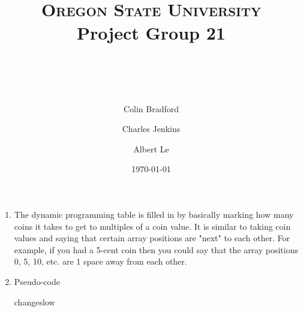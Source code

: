 \documentclass[paper=a4, fontsize=11pt]{scrartcl} %
\title{ 
    \normalfont \normalsize 
    \textsc{Oregon State University} \\ [25pt]
    \large Project Group 21
    \horrule{0.5pt} \\[0.4cm] %
    \huge \hwtitle \\ %
    \horrule{2pt} \\[0.5cm] %
}
\author{
    Colin Bradford
    \and
    Charles Jenkins
    \and
    Albert Le
} %
\date{\normalsize\today} %
\numberwithin{equation}{section} %
\numberwithin{figure}{section} %
\numberwithin{table}{section} %
\begin{document}
\maketitle %

\begin{enumerate}
    \item The dynamic programming table is filled in by basically marking how
    many coins it takes to get to multiples of a coin value. It is similar to
    taking coin values and saying that certain array positions are "next" to each
    other. For example, if you had a 5-cent coin then you could say that the array
    positions 0, 5, 10, etc. are 1 space away from each other.

    \item Pseudo-code
    \begin{description}
        \item[changeslow]


\end{description}
\end{enumerate}
\end{document}

